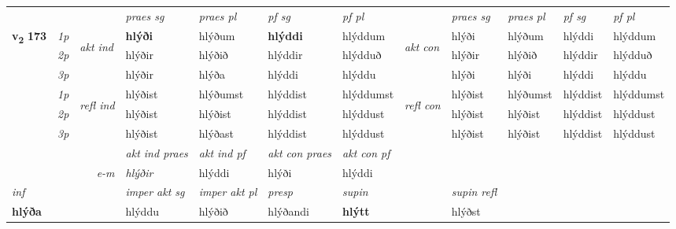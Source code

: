 \begin{longtable}[l]{X>{\footnotesize\itshape}llXXXXlXXXX}
 & &   & \textit{praes sg}  & \textit{praes pl}    & \textit{ pf sg} & \textit{pf pl} & & \textit{praes sg}  & \textit{praes pl}    & \textit{pf sg} & \textit{pf pl }  \\ \cmidrule{4-7} \cmidrule{9-12}
 \multirow{2}{*}{{{\textbf{v{\textsubscript{2}}} \Large{\textbf{173}}}}}  & 1p & \multirow{3}{*}{\begin{turn}{90}\textit{akt ind}\end{turn}} & \textbf{hlýði} & hlýðum & \textbf{hlýddi} & hlýddum & \multirow{3}{*}{\begin{turn}{90}\textit{akt con}\end{turn}} &hlýði & hlýðum & hlýddi & hlýddum\\*
 & 2p &  &  hlýðir  & hlýðið & hlýddir & hlýdduð & & hlýðir & hlýðið & hlýddir & hlýdduð \\*
 & 3p &  & hlýðir & hlýða & hlýddi & hlýddu & & hlýði & hlýði& hlýddi & hlýddu \\*
\cmidrule{4-7} \cmidrule{9-12}
 & 1p & \multirow{3}{*}{\begin{turn}{90}\textit{refl ind}\end{turn}}  & hlýðist & hlýðumst & hlýddist & hlýddumst & \multirow{3}{*}{\begin{turn}{90}\textit{refl con}\end{turn}}  &hlýðist & hlýðumst & hlýddist & hlýddumst \\*
 & 2p &  & hlýðist & hlýðist & hlýddist & hlýddust & &hlýðist & hlýðist & hlýddist & hlýddust \\*
 & 3p  & & hlýðist & hlýðast & hlýddist & hlýddust & & hlýðist & hlýðist& hlýddist & hlýddust \\*
\cmidrule{4-7} \cmidrule{9-12}

   && &  \textit{akt ind praes} & \textit{akt ind pf} & \textit{akt con praes} & \textit{akt con pf} \\*
\multicolumn{3}{r}{\textit{e-m}} & hlýðir & hlýddi & hlýði & hlýddi \\*

\cmidrule{4-7}
   {\textit{inf}} & &  & \textit{imper akt sg} & \textit{imper akt pl}   & \textit{presp} & \textit{supin} && \textit{supin refl}  \\*
  {\textbf{hlýða}} & && hlýddu  & hlýðið   & hlýðandi &  \textbf{hlýtt} && hlýðst  \\*

\midrule


\end{longtable}
